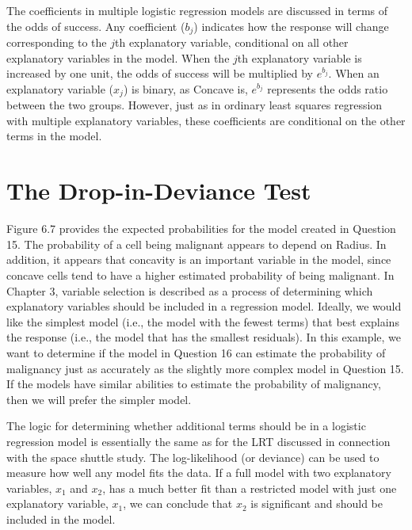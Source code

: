\documentclass[
]{report}
\begin{document}
The coefficients in multiple logistic regression models are discussed in terms of the odds of success. Any coefficient (\(b_j\)) indicates how the response will change corresponding to the \(j\)th explanatory variable, conditional on all other explanatory variables in the model. When the \(j\)th explanatory variable is increased by one unit, the odds of success will be multiplied by \(e^{b_j}\). When an explanatory variable (\(x_j\)) is binary, as Concave is, \(e^{b_j}\) represents the odds ratio between the two groups. However, just as in ordinary least squares regression with multiple explanatory variables, these coefficients are conditional on the other terms in the model.

\hypertarget{the-drop-in-deviance-test}{%
\section{\texorpdfstring{\textbf{The Drop-in-Deviance Test}}{The Drop-in-Deviance Test}}\label{the-drop-in-deviance-test}}

Figure 6.7 provides the expected probabilities for the model created in Question 15. The probability of a cell being malignant appears to depend on Radius. In addition, it appears that concavity is an important variable in the model, since concave cells tend to have a higher estimated probability of being malignant. In Chapter 3, variable selection is described as a process of determining which explanatory variables should be included in a regression model. Ideally, we would like the simplest model (i.e., the model with the fewest terms) that best explains the response (i.e., the model that has the smallest residuals). In this example, we want to determine if the model in Question 16 can estimate the probability of malignancy just as accurately as the slightly more complex model in Question 15. If the models have similar abilities to estimate the probability of malignancy, then we will prefer the simpler model.

The logic for determining whether additional terms should be in a logistic regression model is essentially the same as for the LRT discussed in connection with the space shuttle study. The log-likelihood (or deviance) can be used to measure how well any model fits the data. If a full model with two explanatory variables, \(x_1\) and \(x_2\), has a much better fit than a restricted model with just one explanatory variable, \(x_1\), we can conclude that \(x_2\) is significant and should be included in the model.
\end{document}

